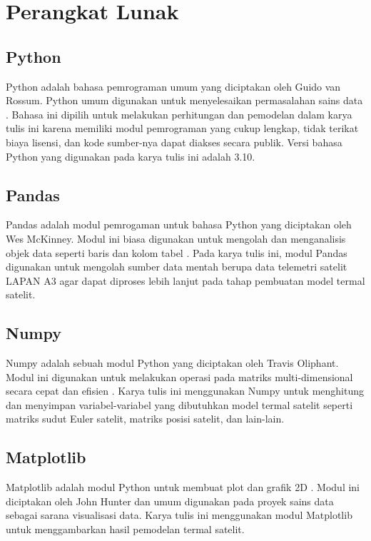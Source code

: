 \section{Perangkat Lunak}

\subsection{Python}

Python adalah bahasa pemrograman umum yang diciptakan oleh Guido van
Rossum. Python umum digunakan untuk menyelesaikan permasalahan sains
data \cite{boschetti2015}. Bahasa ini dipilih untuk melakukan perhitungan dan
pemodelan dalam karya tulis ini karena memiliki modul pemrograman yang
cukup lengkap, tidak terikat biaya lisensi, dan kode sumber-nya dapat
diakses secara publik. Versi bahasa Python yang digunakan pada karya
tulis ini adalah 3.10.

\subsection{Pandas}

Pandas adalah modul pemrogaman untuk bahasa Python yang diciptakan oleh Wes
McKinney. Modul ini biasa digunakan untuk mengolah dan menganalisis objek data
seperti baris dan kolom tabel \cite{reback2022}. Pada karya tulis ini, modul Pandas
digunakan untuk mengolah sumber data mentah berupa data telemetri satelit LAPAN
A3 agar dapat diproses lebih lanjut pada tahap pembuatan model termal satelit.

\subsection{Numpy}

Numpy adalah sebuah modul Python yang diciptakan oleh Travis Oliphant. Modul
ini digunakan untuk melakukan operasi pada matriks multi-dimensional secara
cepat dan efisien \cite{harris2020}. Karya tulis ini menggunakan Numpy untuk
menghitung dan menyimpan variabel-variabel yang dibutuhkan model termal satelit
seperti matriks sudut Euler satelit, matriks posisi satelit, dan lain-lain. 

\subsection{Matplotlib}

Matplotlib adalah modul Python untuk membuat plot dan grafik 2D \cite{hunter2007}.
Modul ini diciptakan oleh John Hunter dan umum digunakan pada proyek sains data
sebagai sarana visualisasi data. Karya tulis ini menggunakan modul Matplotlib
untuk menggambarkan hasil pemodelan termal satelit.

